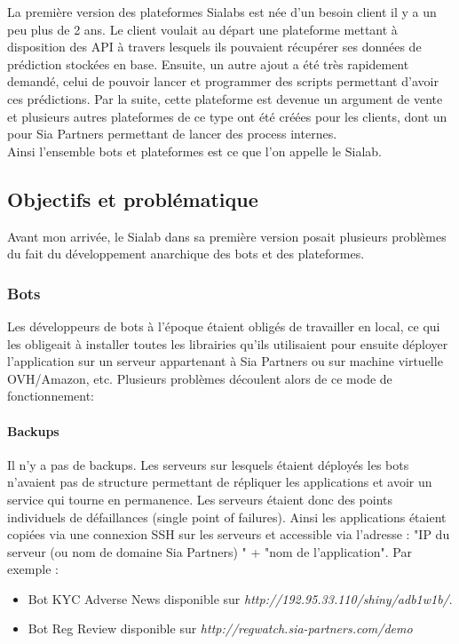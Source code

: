 \documentclass{article} %
\begin{document}
{La première version des plateformes Sialabs est née d'un besoin client il y a un peu plus de 2 ans. Le client voulait au départ une plateforme mettant à disposition des API à travers lesquels ils pouvaient récupérer ses données de prédiction stockées en base. Ensuite, un autre ajout a été très rapidement demandé, celui de pouvoir lancer et programmer des scripts permettant d'avoir ces prédictions. Par la suite, cette plateforme est devenue un argument de vente et plusieurs autres plateformes de ce type ont été créées pour les clients, dont un pour Sia Partners permettant de lancer des process internes.\\

Ainsi l'ensemble bots et plateformes est ce que l'on appelle le Sialab. 

\subsection{Objectifs et problématique}
Avant mon arrivée, le Sialab dans sa première version posait plusieurs problèmes du fait du développement anarchique des bots et des plateformes.

\subsubsection{Bots\\}
Les développeurs de bots à l'époque étaient obligés de travailler en local, ce qui les obligeait à installer toutes les librairies qu'ils utilisaient pour ensuite déployer l'application sur un serveur appartenant à Sia Partners ou sur machine virtuelle OVH/Amazon, etc. Plusieurs problèmes découlent alors de ce mode de fonctionnement:

\paragraph{Backups}
Il n'y a pas de backups. Les serveurs sur lesquels étaient déployés les bots n'avaient pas de structure permettant de répliquer les applications et avoir un service qui tourne en permanence. Les serveurs étaient donc des points individuels de défaillances (single point of failures). Ainsi les applications étaient copiées via une connexion SSH sur les serveurs et accessible via l'adresse : "IP du serveur (ou nom de domaine Sia Partners) " + "nom de l'application". Par exemple : 
\begin{itemize}
 \item Bot KYC Adverse News disponible sur \textit{http://192.95.33.110/shiny/adb1w1b/}.
 \item Bot Reg Review disponible sur \textit{http://regwatch.sia-partners.com/demo}
\end{itemize}


}
\end{document}
